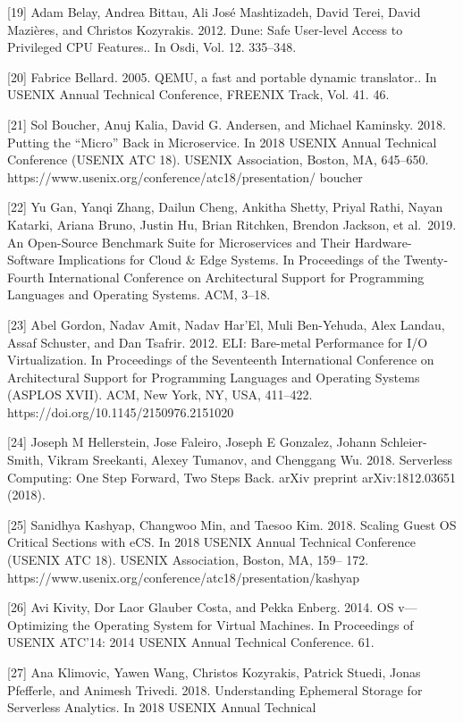 \documentclass[
  10
]{article}
\begin{document}
{[}19{]} Adam Belay, Andrea Bittau, Ali José Mashtizadeh, David Terei,
David Mazières, and Christos Kozyrakis. 2012. Dune: Safe User-level
Access to Privileged CPU Features.. In Osdi, Vol. 12. 335--348.

{[}20{]} Fabrice Bellard. 2005. QEMU, a fast and portable dynamic
translator.. In USENIX Annual Technical Conference, FREENIX Track, Vol.
41. 46.

{[}21{]} Sol Boucher, Anuj Kalia, David G. Andersen, and Michael
Kaminsky. 2018. Putting the ``Micro'' Back in Microservice. In 2018
USENIX Annual Technical Conference (USENIX ATC 18). USENIX Association,
Boston, MA, 645--650.
https://www.usenix.org/conference/atc18/presentation/ boucher

{[}22{]} Yu Gan, Yanqi Zhang, Dailun Cheng, Ankitha Shetty, Priyal
Rathi, Nayan Katarki, Ariana Bruno, Justin Hu, Brian Ritchken, Brendon
Jackson, et al.~2019. An Open-Source Benchmark Suite for Microservices
and Their Hardware-Software Implications for Cloud \& Edge Systems. In
Proceedings of the Twenty-Fourth International Conference on
Architectural Support for Programming Languages and Operating Systems.
ACM, 3--18.

{[}23{]} Abel Gordon, Nadav Amit, Nadav Har'El, Muli Ben-Yehuda, Alex
Landau, Assaf Schuster, and Dan Tsafrir. 2012. ELI: Bare-metal
Performance for I/O Virtualization. In Proceedings of the Seventeenth
International Conference on Architectural Support for Programming
Languages and Operating Systems (ASPLOS XVII). ACM, New York, NY, USA,
411--422. https://doi.org/10.1145/2150976.2151020

{[}24{]} Joseph M Hellerstein, Jose Faleiro, Joseph E Gonzalez, Johann
Schleier-Smith, Vikram Sreekanti, Alexey Tumanov, and Chenggang Wu.
2018. Serverless Computing: One Step Forward, Two Steps Back. arXiv
preprint arXiv:1812.03651 (2018).

{[}25{]} Sanidhya Kashyap, Changwoo Min, and Taesoo Kim. 2018. Scaling
Guest OS Critical Sections with eCS. In 2018 USENIX Annual Technical
Conference (USENIX ATC 18). USENIX Association, Boston, MA, 159-- 172.
https://www.usenix.org/conference/atc18/presentation/kashyap

{[}26{]} Avi Kivity, Dor Laor Glauber Costa, and Pekka Enberg. 2014. OS
v---Optimizing the Operating System for Virtual Machines. In Proceedings
of USENIX ATC'14: 2014 USENIX Annual Technical Conference. 61.

{[}27{]} Ana Klimovic, Yawen Wang, Christos Kozyrakis, Patrick Stuedi,
Jonas Pfefferle, and Animesh Trivedi. 2018. Understanding Ephemeral
Storage for Serverless Analytics. In 2018 USENIX Annual Technical
\end{document}
